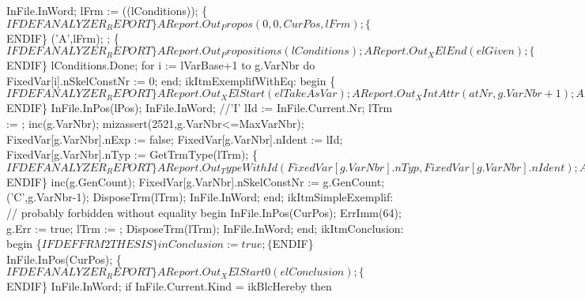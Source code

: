                InFile.InWord;
               lFrm := ((lConditions));
               \{$IFDEF ANALYZER_REPORT\}
               AReport.Out_Propos(0, 0, CurPos, lFrm);
               \{$ENDIF\}      
               ('A',lFrm);
               ;
               \{$IFDEF ANALYZER_REPORT\}
               AReport.Out_Propositions(lConditions);
               AReport.Out_XElEnd(elGiven);
               \{$ENDIF\}
               lConditions.Done;
               for i := lVarBase+1 to g.VarNbr do FixedVar[i].nSkelConstNr := 0;
            end;
         ikItmExemplifWithEq:
            begin
               \{$IFDEF ANALYZER_REPORT\}
               AReport.Out_XElStart(elTakeAsVar);
               AReport.Out_XIntAttr(atNr, g.VarNbr+1);
               AReport.Out_XAttrEnd;
               \{$ENDIF\}
               InFile.InPos(lPos);
               InFile.InWord; //'I'
               lId := InFile.Current.Nr;
               lTrm := ;
               inc(g.VarNbr); mizassert(2521,g.VarNbr<=MaxVarNbr);
               FixedVar[g.VarNbr].nExp := false;
               FixedVar[g.VarNbr].nIdent := lId;
               FixedVar[g.VarNbr].nTyp := GetTrmType(lTrm);
               \{$IFDEF ANALYZER_REPORT\}
               AReport.Out_TypeWithId(FixedVar[g.VarNbr].nTyp,
                                      FixedVar[g.VarNbr].nIdent);
               AReport.Out_Term(lTrm);
               AReport.Out_XElEnd(elTakeAsVar);
               \{$ENDIF\}
               inc(g.GenCount);
               FixedVar[g.VarNbr].nSkelConstNr := g.GenCount;
               ('C',g.VarNbr-1);
               DisposeTrm(lTrm); InFile.InWord;
            end;
         ikItmSimpleExemplif:  // probably forbidden without equality
            begin
               InFile.InPos(CurPos);
               ErrImm(64);
               g.Err := true;
               lTrm := ;
               DisposeTrm(lTrm); InFile.InWord;
            end;
         ikItmConclusion:
            begin
               \{$IFDEF FRM2THESIS\}
               inConclusion := true;
               \{$ENDIF\}
               InFile.InPos(CurPos);
               \{$IFDEF ANALYZER_REPORT\}
               AReport.Out_XElStart0(elConclusion);
               \{$ENDIF\}
               InFile.InWord;
               if InFile.Current.Kind = ikBlcHereby then
